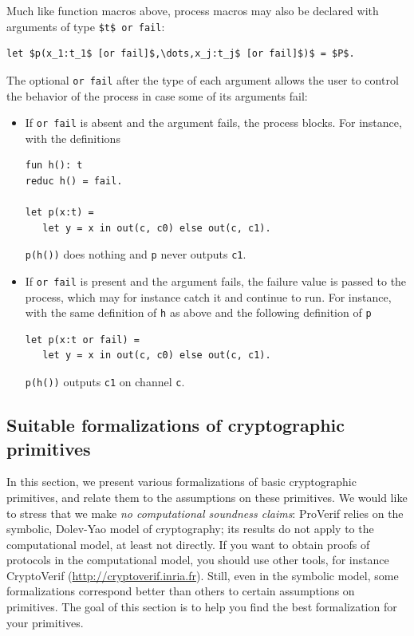 \documentclass{book}
\begin{document}
Much like function macros above, process macros may also be declared with arguments of
type \lstinline!$t$ or fail!:
\begin{lstlisting}[numbers=none]
	let $p(x_1:t_1$ [or fail]$,\dots,x_j:t_j$ [or fail]$)$ = $P$.
\end{lstlisting}
The optional \lstinline!or fail! after the type of each argument allows the user to control the behavior of the process in case some of its arguments fail:
\begin{itemize}
\item If \lstinline!or fail! is absent and the argument fails, the process blocks.
For instance, with the definitions
\begin{lstlisting}[numbers=none]
fun h(): t
reduc h() = fail.

let p(x:t) =
   let y = x in out(c, c0) else out(c, c1).
\end{lstlisting}
\lstinline!p(h())! does nothing and \lstinline!p! never outputs \lstinline!c1!.

\item If \lstinline!or fail! is present and the argument fails, the failure value is passed to the process, which may for instance catch it and continue to run.
For instance, with the same definition of \lstinline!h! as above and the following definition of \lstinline!p!
\begin{lstlisting}[numbers=none]
let p(x:t or fail) =
   let y = x in out(c, c0) else out(c, c1).
\end{lstlisting}
\lstinline!p(h())! outputs \lstinline!c1! on channel \lstinline!c!.

\end{itemize}


\subsection{Suitable formalizations of cryptographic primitives}\label{sec:cryptoprimformalization}

In this section, we present various formalizations of basic
cryptographic primitives, and relate them to the assumptions on these
primitives. We would like to stress that we make \emph{no
  computational soundness claims}: ProVerif relies on the symbolic,
Dolev-Yao model of cryptography; its results do not apply to the
computational model, at least not directly. If you want to obtain
proofs of protocols in the computational model, you should use other
tools, for instance CryptoVerif
(\url{http://cryptoverif.inria.fr}). Still, even in the symbolic
model, some formalizations correspond better than others to certain
assumptions on primitives. The goal of this section is to help you
find the best formalization for your primitives.
\end{document}
